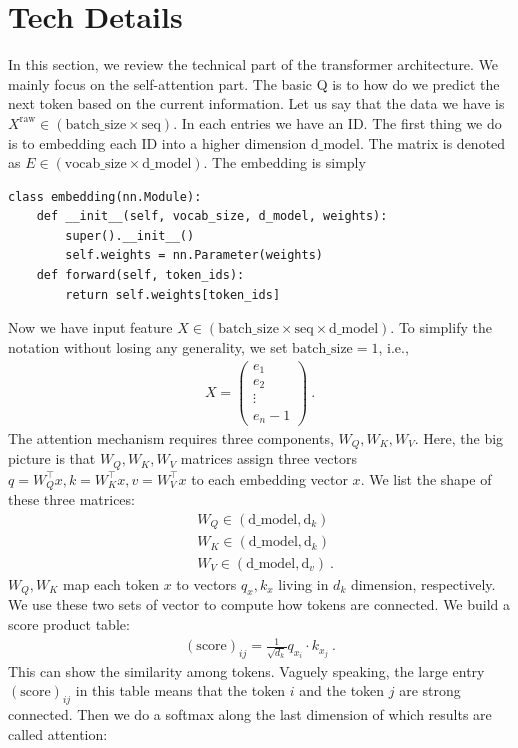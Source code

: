 \documentclass{article}
\newcommand{\bs}{\textrm{batch\_size}}
\newcommand{\seq}{\textrm{seq}}
\newcommand{\dm}{\textrm{d\_model}}
\newcommand{\vs}{\textrm{vocab\_size}}
\newcommand{\raw}{\textrm{raw}}
\begin{document}
\section{Tech Details}
In this section, we review the technical part of the transformer architecture. We mainly focus on the self-attention part. The basic Q is to how do we predict the next token based on the current information. Let us say that the data we have is $X^{\raw} \in (\bs \times \seq ) $. In each entries we have an ID. The first thing we do is to embedding each ID into a higher dimension $\dm$. The matrix is denoted as $E \in (\vs \times \dm)$. The embedding is simply
\begin{verbatim}
class embedding(nn.Module):
    def __init__(self, vocab_size, d_model, weights):
        super().__init__()
        self.weights = nn.Parameter(weights)
    def forward(self, token_ids):
        return self.weights[token_ids]
\end{verbatim}
Now we have input feature $X \in ( \bs \times\seq\times\dm)$. To simplify the notation without losing any generality, we set $\bs = 1$, i.e., 
\begin{align}
    X = \begin{pmatrix}
        e_1 \\
        e_2 \\
        \vdots\\
        e_n-1
    \end{pmatrix}~.
\end{align}
The attention mechanism requires three components, $W_Q,W_K,W_V$. Here, the big picture is that $W_Q,W_K,W_V$ matrices assign three vectors $q=W_{Q}^{\top} x,  k=W_{K}^{\top}x , v=W_{V}^{\top} x$ to each embedding vector $x$. We list the shape of these three matrices:
\begin{align*}
    &W_Q \in (\dm, \text{d}_k) \\
    &W_K \in (\dm, \text{d}_k) \\
    &W_V \in (\dm, \text{d}_v) ~.
\end{align*}
$W_Q, W_K$ map each token $x$ to vectors $q_{x},k_{x}$ living in $d_{k}$ dimension, respectively. We use these two sets of vector to compute how tokens are connected. We build a score product table:
\begin{align}
    (\text{score})_{ij} = \frac{1}{\sqrt{d_{k}}} q_{x_i}\cdot k_{x_{j}}~.
\end{align}
This can show the similarity among tokens. Vaguely speaking, the large entry \((\text{score})_{ij}\) in this table means that the token \(i\) and the token \(j\) are strong connected. Then we do a softmax along the last dimension of which results are called attention:
\end{document}
